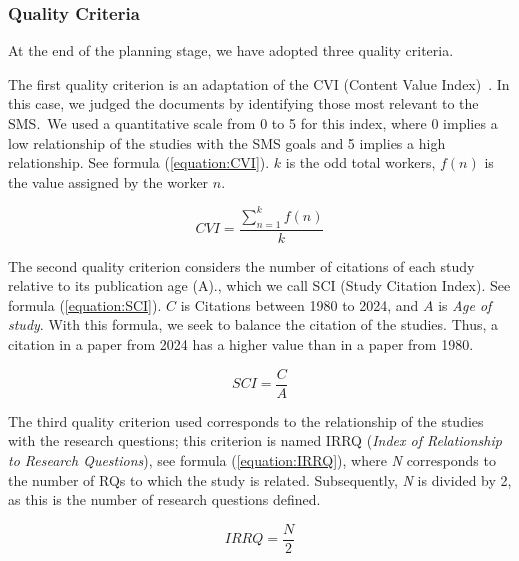 
\subsubsection{Quality Criteria}
At the end of the planning stage, we have adopted three quality criteria.

The first quality criterion is an adaptation of the CVI (Content Value Index)~\cite{Almanasreh2019214, yaghmaei2003content}. In this case, we judged the documents by identifying those most relevant to the SMS.~We used a quantitative scale from 0 to 5 for this index, where 0 implies a low relationship of the studies with the SMS goals and 5 implies a high relationship. See formula (\ref{equation:CVI}). $k$ is the odd total workers, $f(n)$ is the value assigned by the worker $n$.

\begin{equation}
	\label{equation:CVI}
	CVI = \frac{\sum_{n=1}^{k} f(n)}{k}
\end{equation}

The second quality criterion considers the number of citations of each study relative to its publication age (A)., which we call SCI (Study Citation Index). See  formula (\ref{equation:SCI}). $C$ is Citations between 1980 to 2024, and $A$ is \textit{Age of study}. With this formula, we seek to balance the citation of the studies. Thus, a citation in a  paper from 2024 has a higher value than in a paper from 1980.


\begin{equation}
	\label{equation:SCI}
	SCI = \frac{C}{A}
\end{equation}


\hbox{}
The third quality criterion used corresponds to the relationship of the studies with the research questions; this criterion is named IRRQ (\textit{Index of Relationship to Research Questions}), see formula (\ref{equation:IRRQ}), where \textit{N} corresponds to the number of RQs to which the study is related. Subsequently, \textit{N} is divided by 2, as this is the number of research questions defined.

\begin{equation}
	\label{equation:IRRQ}
	IRRQ = \frac{N}{2}
\end{equation}

